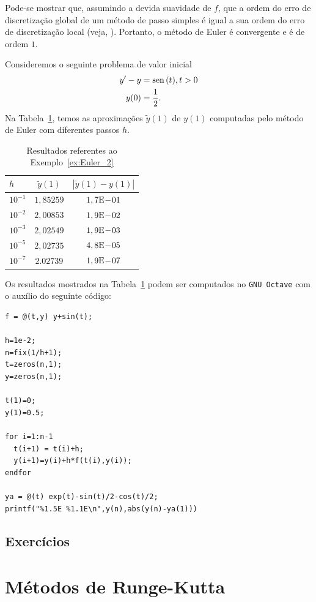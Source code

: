 \begin{obs}
  Pode-se mostrar que, assumindo a devida suavidade de $f$, que a ordem do erro de discretização global de um método de passo simples é igual a sua ordem do erro de discretização local (veja, \cite[Cap. 7, Sec. 7.2]{Stoer1993a}). Portanto, o método de Euler é convergente e é de ordem $1$.
\end{obs}

\begin{ex}\label{ex:Euler_1}
  Consideremos o seguinte problema de valor inicial
  \begin{align}
    y' - y &= \operatorname{sen}\,(t), t>0\label{eq:Euler_aux2}\\
    y(0) &= \frac{1}{2}.
  \end{align}
  Na Tabela~\ref{tab:ex_Euler_2}, temos as aproximações $\tilde{y}(1)$ de $y(1)$ computadas pelo método de Euler com diferentes passos $h$.
 
  \begin{table}[h!]
    \centering
    \begin{tabular}{l|cc}
      $h$ & $\tilde{y}(1)$ & $|\tilde{y}(1)-y(1)|$\\\hline
      $10^{-1}$ & $1,85259$ & $1,7\mathrm{E}\!-\!01$ \\
      $10^{-2}$ & $2,00853$ & $1,9\mathrm{E}\!-\!02$ \\
      $10^{-3}$ & $2,02549$ & $1,9\mathrm{E}\!-\!03$ \\
      $10^{-5}$ & $2,02735$ & $4,8\mathrm{E}\!-\!05$ \\
      $10^{-7}$ & $2.02739$ & $1,9\mathrm{E}\!-\!07$ \\\hline
    \end{tabular}
    \caption{Resultados referentes ao Exemplo~\ref{ex:Euler_2}}
    \label{tab:ex_Euler_2}
  \end{table}

\ifisoctave
Os resultados mostrados na Tabela~\ref{tab:ex_Euler_2} podem ser computados no \verb+GNU Octave+ com o auxílio do seguinte código:
\begin{verbatim}
f = @(t,y) y+sin(t);

h=1e-2;
n=fix(1/h+1);
t=zeros(n,1);
y=zeros(n,1);

t(1)=0;
y(1)=0.5;

for i=1:n-1
  t(i+1) = t(i)+h;
  y(i+1)=y(i)+h*f(t(i),y(i));
endfor

ya = @(t) exp(t)-sin(t)/2-cos(t)/2;
printf("%1.5E %1.1E\n",y(n),abs(y(n)-ya(1)))
\end{verbatim}
\fi
\end{ex}

\subsection*{Exercícios}

\emconstrucao

\section{Métodos de Runge-Kutta}

\emconstrucao
